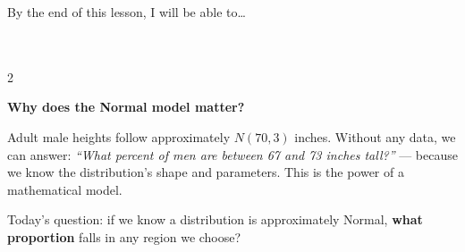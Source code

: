 \documentclass[10pt]{article}
\begin{document}
\namedateperiod

\vspace{0.10in}

\begin{objectivebox}
\small By the end of this lesson, I will be able to\dots\\[4pt]
\writeline\\[1pt]
\writeline\\[1pt]
\writeline
\end{objectivebox}

\vspace{0.10in}

\begin{vocabbox}
\begin{multicols}{2}
\columnbreak
{}
\end{multicols}
\end{vocabbox}

\vspace{0.10in}

\begin{hookbox}
\small\textbf{Why does the Normal model matter?}

\vspace{5pt}
Adult male heights follow approximately $N(70, 3)$ inches. Without any data, we can
answer: \textit{``What percent of men are between 67 and 73 inches tall?''} --- because
we know the distribution's shape and parameters. This is the power of a mathematical model.

\vspace{4pt}
Today's question: if we know a distribution is approximately Normal,
\textbf{what proportion} falls in any region we choose?
\end{hookbox}

\vspace{0.08in}
\end{document}
